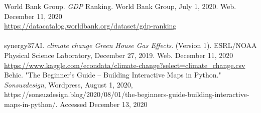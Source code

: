\documentclass[fontsize=11pt]{article}
\begin{document}
World Bank Group. \emph{GDP} Ranking. World Bank Group, July 1, 2020. Web. December 11, 2020\\
\href{https://datacatalog.worldbank.org/dataset/gdp-ranking}{https://datacatalog.worldbank.org/dataset/gdp-ranking} \\\\

synergy37AI. \emph{climate change Green House Gas Effects}. (Version 1). ESRL/NOAA Physical Science Laboratory, December 27, 2019. Web. December 11, 2020
\href{https://www.kaggle.com/econdata/climate-change?select=climate\_change.csv}{https://www.kaggle.com/econdata/climate-change?select=climate\_change.csv} \\

Behic. "The Beginner’s Guide – Building Interactive Maps in Python." \emph{Sonsuzdesign}, Wordpress, August 1, 2020, https://sonsuzdesign.blog/2020/08/01/the-beginners-guide-building-interactive-maps-in-python/. Accessed December 13, 2020
\end{document}
